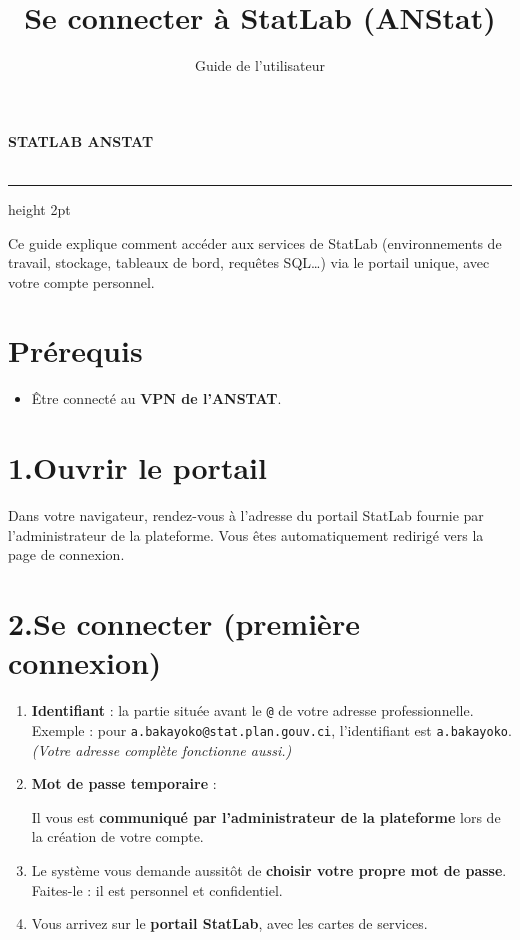 \documentclass[11pt,a4paper]{article}
\title{Se connecter à StatLab (ANStat)}
\date{Guide de l'utilisateur}
\makeatletter
\renewcommand{\maketitle}{%
  \begin{center}
    {\small\color{anstatorange}\bfseries\MakeUppercase{StatLab \textperiodcentered{} ANStat}}\\[2pt]
    {\LARGE\bfseries\color{anstatvertfonce}\@title}\\[4pt]
    {\color{anstatgris}\@date}
  \end{center}
  \vspace{4pt}
  {\color{anstatorange}\hrule height 2pt}
  \vspace{10pt}
}
\makeatother
\begin{document}
\maketitle

\noindent
Ce guide explique comment accéder aux services de StatLab (environnements de travail,
stockage, tableaux de bord, requêtes SQL\dots) via le portail unique, avec votre
compte personnel.

\section*{Prérequis}
\begin{itemize}
  \item Être connecté au \textbf{VPN de l'ANSTAT}.
\end{itemize}

\section*{1.\quad Ouvrir le portail}
Dans votre navigateur, rendez-vous à l'adresse du portail StatLab fournie par
l'administrateur de la plateforme.
Vous êtes automatiquement redirigé vers la page de connexion.

\section*{2.\quad Se connecter (première connexion)}
\begin{enumerate}
  \item \textbf{Identifiant} : la partie située avant le \texttt{@} de votre adresse
        professionnelle. \\
        Exemple : pour \texttt{a.bakayoko@stat.plan.gouv.ci}, l'identifiant est
        \texttt{a.bakayoko}. \emph{(Votre adresse complète fonctionne aussi.)}
  \item \textbf{Mot de passe temporaire} :
        \begin{infobox}
          Il vous est \textbf{communiqué par l'administrateur de la plateforme} lors de
          la création de votre compte.
        \end{infobox}
  \item Le système vous demande aussitôt de \textbf{choisir votre propre mot de passe}.
        Faites-le : il est personnel et confidentiel.
  \item Vous arrivez sur le \textbf{portail StatLab}, avec les cartes de services.
\end{enumerate}
\end{document}
